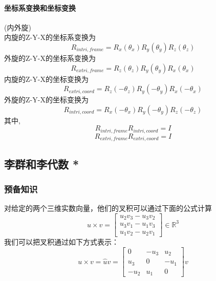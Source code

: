 \documentclass{ctexart}
\begin{document}
	\paragraph{坐标系变换和坐标变换}
	(内外旋)
	\\
	内旋的Z-Y-X的坐标系变换为
	\begin{equation}
	R_{intri,frame}=R_x(\theta_x) R_y(\theta_y) R_z(\theta_z)
	\end{equation}
	外旋的Z-Y-X的坐标系变换为
	\begin{equation}
	R_{extri,frame}=R_z(\theta_z) R_y(\theta_y) R_x(\theta_x)
	\end{equation}
	内旋的Z-Y-X的坐标变换为
	\begin{equation}
	R_{extri,coord}=R_z(-\theta_z) R_y(-\theta_y) R_x(-\theta_x)
	\end{equation}
	外旋的Z-Y-X的坐标变换为
	\begin{equation}
	R_{intri,coord}=R_x(-\theta_x) R_y(-\theta_y) R_z(-\theta_z)
	\end{equation}
	其中,
	\begin{equation}
	R_{intri,frame} R_{intri,coord} = I
	\end{equation}
	\begin{equation}
	R_{extri,frame} R_{extri,coord} = I
	\end{equation}
	
	
	
	\subsection{李群和李代数 *}
	\subsubsection{预备知识}
	对给定的两个三维实数向量，他们的叉积可以通过下面的公式计算
	\begin{equation}
	u \times v =
	\begin{bmatrix}
	u_2 v_3 - u_3 v_2 \\
	u_3 v_1 - u_1 v_3 \\
	u_1 v_2 - u_2 v_1
	\end{bmatrix}
	\in \mathbb{R}^3
	\end{equation}
	我们可以把叉积通过如下方式表示：
	\begin{equation}
	u \times v =
	\hat{u} v =
	\begin{bmatrix}
	0 & -u_3 & u_2 \\
	u_3 & 0 & -u_1 \\
	-u_2 & u_1 & 0
	\end{bmatrix}
	v
	\end{equation}
\end{document}
